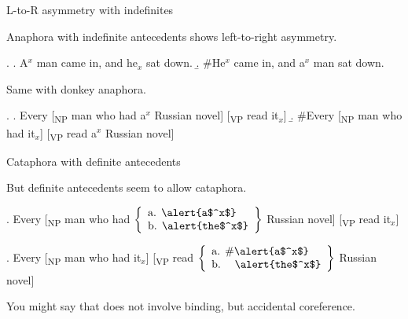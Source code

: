 \documentclass{beamer}
\begin{document}
\renewcommand{\Exlabelsep}{6pt}
\renewcommand{\SubExleftmargin}{18pt}



\begin{frame}{L-to-R asymmetry with indefinites}

Anaphora with indefinite antecedents shows left-to-right asymmetry.

\ex.
  \a. \alert{A$^x$ man} came in, and \alert{he$_x$} sat down.
  \b. \#\alert{He$^x$} came in, and \alert{a$^x$ man} sat down.

Same with donkey anaphora.

\ex.
  \a. Every [\textsubscript{NP} man who had \alert{a$^x$ Russian novel}] [\textsubscript{VP} read \alert{it$_x$}]
  \b. \#Every [\textsubscript{NP} man who had \alert{it$_x$}] [\textsubscript{VP} read \alert{a$^x$ Russian novel}]


\end{frame}

\begin{frame}{Cataphora with definite antecedents}

But definite antecedents seem to allow cataphora.

\ex.
  Every [\textsubscript{NP} man who had $\left\{\begin{array}{l}\text{a. \alert{a$^x$}}\\\text{b. \alert{the$^x$}}\end{array}\right\}$ \alert{Russian novel}] [\textsubscript{VP} read \alert{it$_x$}]

\ex.
  Every [\textsubscript{NP} man who had \alert{it$_x$}] [\textsubscript{VP} read $\left\{\begin{array}{l}\text{a. \#\alert{a$^x$}}\\\text{b. \phantom{\#}\alert{the$^x$}}\end{array}\right\}$ \alert{Russian novel}]


You might say that \Last[b] does not involve binding, but \alert{accidental coreference}.



\end{frame}
\end{document}
